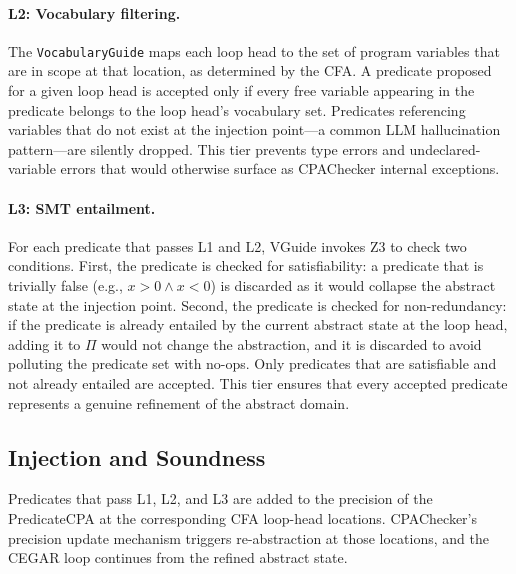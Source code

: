 \paragraph{L2: Vocabulary filtering.} The \texttt{VocabularyGuide} maps each loop
head to the set of program variables that are in scope at that location, as determined
by the CFA. A predicate proposed for a given loop head is accepted only if every free
variable appearing in the predicate belongs to the loop head's vocabulary set. Predicates
referencing variables that do not exist at the injection point---a common LLM
hallucination pattern---are silently dropped. This tier prevents type errors and
undeclared-variable errors that would otherwise surface as CPAChecker internal
exceptions.

\paragraph{L3: SMT entailment.} For each predicate that passes L1 and L2, VGuide
invokes Z3 to check two conditions. First, the predicate is checked for satisfiability:
a predicate that is trivially false (e.g., $x > 0 \wedge x < 0$) is discarded as it
would collapse the abstract state at the injection point. Second, the predicate is
checked for non-redundancy: if the predicate is already entailed by the current abstract
state at the loop head, adding it to $\Pi$ would not change the abstraction, and it is
discarded to avoid polluting the predicate set with no-ops. Only predicates that are
satisfiable and not already entailed are accepted. This tier ensures that every accepted
predicate represents a genuine refinement of the abstract domain.

\subsection{Injection and Soundness}

Predicates that pass L1, L2, and L3 are added to the precision of the PredicateCPA
at the corresponding CFA loop-head locations. CPAChecker's precision update mechanism
triggers re-abstraction at those locations, and the CEGAR loop continues from the
refined abstract state.


